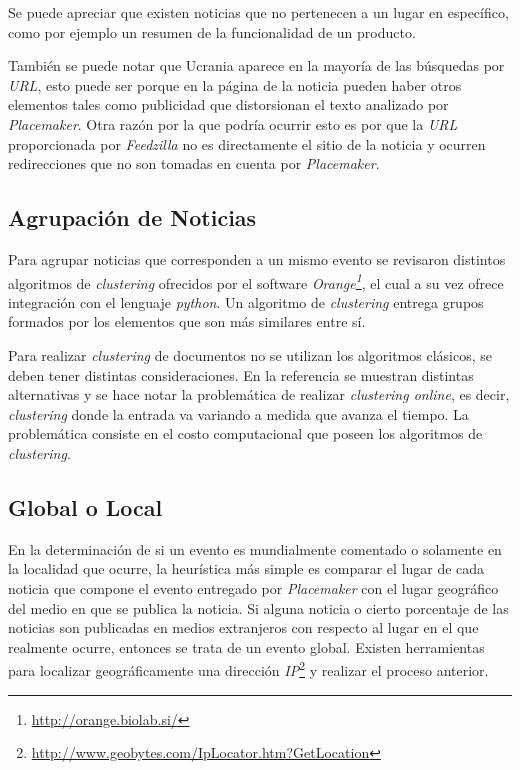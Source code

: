 \documentclass[10pt]{article}
\begin{document}
Se puede apreciar que existen noticias que no pertenecen a un lugar en específico, como por ejemplo un resumen de la funcionalidad de un producto.

También se puede notar que Ucrania aparece en la mayoría de las búsquedas por \emph{URL}, esto puede ser porque en la página de la noticia pueden haber otros elementos tales como publicidad que distorsionan el texto analizado por \emph{Placemaker}. Otra razón por la que podría ocurrir esto es por que la \emph{URL} proporcionada por \emph{Feedzilla} no es directamente el sitio de la noticia y ocurren redirecciones que no son tomadas en cuenta por \emph{Placemaker}.

\subsection{Agrupación de Noticias}
Para agrupar noticias que corresponden a un mismo evento se revisaron distintos algoritmos de \emph{clustering} ofrecidos por el software \emph{Orange\footnote{\url{http://orange.biolab.si/}}}, el cual a su vez ofrece integración con el lenguaje \emph{python}. Un algoritmo de \emph{clustering} entrega grupos formados por los elementos que son más similares entre sí.

Para realizar \emph{clustering} de documentos no se utilizan los algoritmos clásicos, se deben tener distintas consideraciones. En la referencia \cite{doccluster} se muestran distintas alternativas y se hace notar la problemática de realizar \emph{clustering online}, es decir, \emph{clustering} donde la entrada va variando a medida que avanza el tiempo. La problemática consiste en el costo computacional que poseen los algoritmos de \emph{clustering}.

\subsection{Global o Local}
En la determinación de si un evento es mundialmente comentado o solamente en la localidad que ocurre, la heurística más simple es comparar el lugar de cada noticia que compone el evento entregado por \emph{Placemaker} con el lugar geográfico del medio en que se publica la noticia. Si alguna noticia o cierto porcentaje de las noticias son publicadas en medios extranjeros con respecto al lugar en el que realmente ocurre, entonces se trata de un evento global. Existen herramientas para localizar geográficamente una dirección \emph{IP}\footnote{\url{http://www.geobytes.com/IpLocator.htm?GetLocation}} y realizar el proceso anterior.
\end{document}
